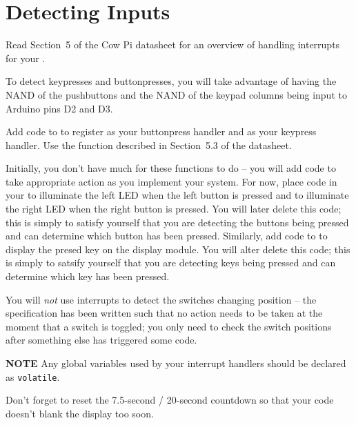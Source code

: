 \section{Detecting Inputs} \label{sec:DetectingInputs}

Read Section~5 of the Cow Pi datasheet for an overview of handling interrupts for your \developmentboard.

To detect keypresses and buttonpresses, you will take advantage of having the NAND of the pushbuttons and the NAND of the keypad columns being input to Arduino pins D2 and D3.

Add code to  to register  as your buttonpress handler and  as your keypress handler.
Use the  function described in Section~5.3 of the datasheet.

Initially, you don't have much for these functions to do -- you will add code to take appropriate action as you implement your system.
For now, place code in your  to illuminate the left LED when the left button is pressed and to illuminate the right LED when the right button is pressed.
You will later delete this code; this is simply to satisfy yourself that you are detecting the buttons being pressed and can determine which button has been pressed.
Similarly, add code to  to display the presed key on the display module.
You will alter delete this code; this is simply to satsify yourself that you are detecting keys being pressed and can determine which key has been pressed.

You will \textit{not} use interrupts to detect the switches changing position -- the specification has been written such that no action needs to be taken at the moment that a switch is toggled;
you only need to check the switch positions after something else has triggered some code.

\textbf{NOTE} Any global variables used by your interrupt handlers should be declared as \lstinline{volatile}.

Don't forget to reset the 7.5\mbox{-}second / 20\mbox{-}second countdown so that your code doesn't blank the display too soon.

